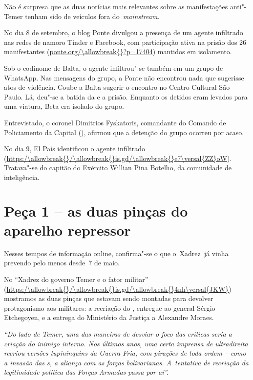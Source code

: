  

Não é surpresa que as duas notícias mais relevantes sobre as
manifestações anti"-Temer tenham sido de veículos fora
do~\emph{mainstream}.

No dia 8 de setembro, o blog Ponte divulgou a presença de um agente
infiltrado nas redes de namoro Tinder e Facebook, com participação ativa
na prisão dos 26 manifestantes (\url{ponte.org/\allowbreak{}?p=17404})
mantidos em isolamento.

Sob o codinome de Balta, o agente infiltrou"-se também em um grupo de
WhatsApp. Nas mensagens do grupo, a Ponte não encontrou nada que
sugerisse atos de violência. Coube a Balta sugerir o encontro no Centro
Cultural São Paulo. Lá, deu"-se a batida da  e a prisão. Enquanto os
detidos eram levados para uma viatura, Beta era isolado do grupo.

Entrevistado, o coronel Dimitrios Fyskatoris, comandante do Comando de
Policiamento da Capital (), afirmou que a detenção do grupo ocorreu
por acaso.

No dia 9, El País identificou o agente infiltrado
(\url{https:/\allowbreak{}/\allowbreak{}is.gd/\allowbreak{}e7\versal{ZZ}oW}). Tratava"-se do capitão do Exército Willian
Pina Botelho, da comunidade de inteligência.

\section{Peça 1 -- as duas pinças do aparelho repressor}

Nesses tempos de informação online, confirma"-se o que o~Xadrez~já vinha
prevendo pelo menos desde~7 de maio.

No ``Xadrez do governo Temer e o fator militar''
(\url{https:/\allowbreak{}/\allowbreak{}is.gd/\allowbreak{}4nh\versal{JKW}}) mostramos as duas pinças que estavam sendo
montadas para devolver protagonismo aos militares: a recriação do ,
entregue ao general Sérgio Etchegoyen, e a entrega do Ministério da
Justiça a Alexandre Moraes.

\emph{``Do lado de Temer, uma das maneiras de desviar o foco das
críticas seria a criação do inimigo interno. Nos últimos anos, uma certa
imprensa de ultradireita recriou versões tupininquins da Guerra Fria,
com pirações de toda ordem -- como a invasão das s, a aliança com as
forças bolivarianas. A~tentativa de recriação da legitimidade política
das Forças Armadas passa por aí''.}

